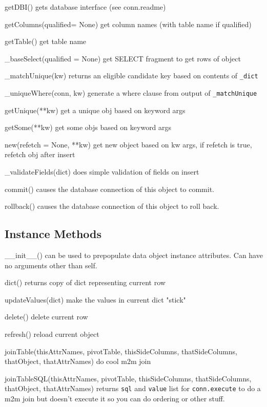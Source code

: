 \documentclass[titlepage]{manual}
\begin{document}
\begin{argdesc}
\item[getDBI()] gets database interface (see conn.readme)
\item[getColumns(qualified= None)] get column names (with table name
if qualified)
\item[getTable()] get table name
\item[_baseSelect(qualified = None)] get SELECT fragment to get rows
of object
\item[_matchUnique(kw)] returns an eligible candidate key based on
contents of \texttt{\_dict}
\item[_uniqueWhere(conn, kw)] generate a where clause from output of
\texttt{\_matchUnique}
\item[getUnique(**kw)] get a unique obj based on keyword args
\item[getSome(**kw)] get some objs based on keyword args
\item[new(refetch = None, **kw)] get new object based on kw args, if
refetch is true, refetch obj after insert
\item[_validateFields(dict)] does simple validation of fields on
insert
\item[commit()] causes the database connection of this object to
commit.
\item[rollback()]  causes the database connection of this object to
roll back.
\end{argdesc}

\subsection{Instance Methods}
\begin{argdesc}
\item[__init__()] can be used to prepopulate data object instance attributes.  Can have no arguments other than self.
\item[dict()] returns copy of dict representing current row
\item[updateValues(dict)] make the values in current dict "stick"
\item[delete()] delete current row
\item[refresh()] reload current object
\item[joinTable(thisAttrNames, pivotTable, thisSideColumns,
thatSideColumns, thatObject, thatAttrNames)] do cool m2m join
\item[joinTableSQL(thisAttrNames, pivotTable, thisSideColumns,
thatSideColumns, thatObject, thatAttrNames)] returns \texttt{sql} and
\texttt{value} list for \texttt{conn.execute} to do a m2m join but
doesn't execute it so you can do ordering or other stuff.
\end{argdesc}
\end{document}
